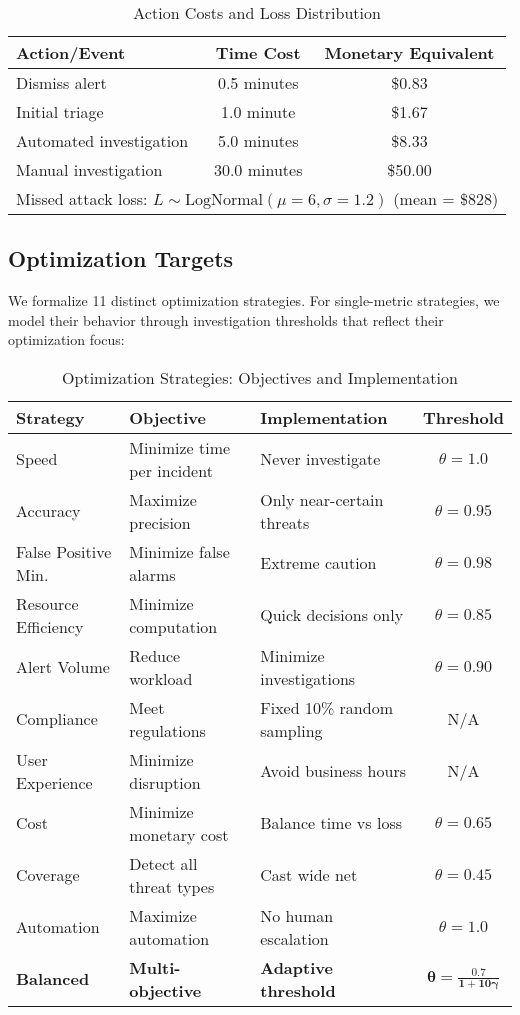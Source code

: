 \documentclass[10pt,conference]{IEEEtran}
\begin{document}
\begin{table}[!h]
\centering
\caption{Action Costs and Loss Distribution}
\begin{tabular}{@{}lcc@{}}
\toprule
\textbf{Action/Event} & \textbf{Time Cost} & \textbf{Monetary Equivalent} \\
\midrule
Dismiss alert & 0.5 minutes & \$0.83 \\
Initial triage & 1.0 minute & \$1.67 \\
Automated investigation & 5.0 minutes & \$8.33 \\
Manual investigation & 30.0 minutes & \$50.00 \\
\midrule
\multicolumn{3}{l}{Missed attack loss: $L \sim \text{LogNormal}(\mu=6, \sigma=1.2)$ (mean = \$828)} \\
\bottomrule
\end{tabular}
\end{table}

\subsection{Optimization Targets}

We formalize 11 distinct optimization strategies. For single-metric strategies, we model their behavior through investigation thresholds that reflect their optimization focus:

\begin{table*}[h]
\centering
\caption{Optimization Strategies: Objectives and Implementation}
\footnotesize
\begin{tabular}{@{}lllc@{}}
\toprule
\textbf{Strategy} & \textbf{Objective} & \textbf{Implementation} & \textbf{Threshold} \\
\midrule
Speed & Minimize time per incident & Never investigate & $\theta = 1.0$ \\
Accuracy & Maximize precision & Only near-certain threats & $\theta = 0.95$ \\
False Positive Min. & Minimize false alarms & Extreme caution & $\theta = 0.98$ \\
Resource Efficiency & Minimize computation & Quick decisions only & $\theta = 0.85$ \\
Alert Volume & Reduce workload & Minimize investigations & $\theta = 0.90$ \\
Compliance & Meet regulations & Fixed 10\% random sampling & N/A \\
User Experience & Minimize disruption & Avoid business hours & N/A \\
Cost & Minimize monetary cost & Balance time vs loss & $\theta = 0.65$ \\
Coverage & Detect all threat types & Cast wide net & $\theta = 0.45$ \\
Automation & Maximize automation & No human escalation & $\theta = 1.0$ \\
\textbf{Balanced} & \textbf{Multi-objective} & \textbf{Adaptive threshold} & $\boldsymbol{\theta = \frac{0.7}{1 + 10\gamma}}$ \\
\bottomrule
\end{tabular}
\end{table*}
\end{document}
